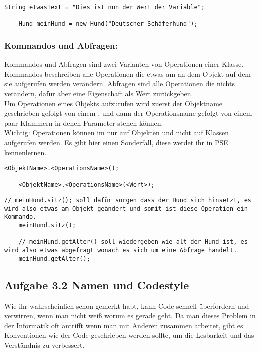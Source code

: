 \begin{lstlisting}[title=\textbf{Variable Beispiel}]
	String etwasText = "Dies ist nun der Wert der Variable";
	
	Hund meinHund = new Hund("Deutscher Schäferhund");
\end{lstlisting}
\begin{Infobox}
	\subsubsection*{Kommandos und Abfragen:}
	Kommandos und Abfragen sind zwei Varianten von Operationen einer Klasse. Kommandos beschreiben alle Operationen die etwas am an dem Objekt auf dem sie aufgerufen werden verändern.
	Abfragen sind alle Operationen die nichts verändern, dafür aber eine Eigenschaft als Wert zurückgeben.\\
	Um Operationen eines Objekts aufzurufen wird zuerst der Objektname geschrieben gefolgt von einem . und dann der Operationsname gefolgt von einem paar Klammern in denen Parameter stehen können.\\
	{\color{red} Wichtig: } Operationen können im nur auf Objekten und nicht auf Klassen aufgerufen werden.
	Es  gibt hier einen Sonderfall, diese werdet ihr in PSE kennenlernen.
\end{Infobox}
\begin{lstlisting}[title=\textbf{Kommando/Abfrage Syntax}]
	<ObjektName>.<OperationsName>();
	
	<ObjektName>.<OperationsName>(<Wert>);
\end{lstlisting}
\newpage
\begin{lstlisting}[title=\textbf{Kommando/Abfrage Beispiel}]
	// meinHund.sitz(); soll dafür sorgen dass der Hund sich hinsetzt, es wird also etwas am Objekt geändert und somit ist diese Operation ein Kommando.
	meinHund.sitz();
	
	// meinHund.getAlter() soll wiedergeben wie alt der Hund ist, es wird also etwas abgefragt wonach es sich um eine Abfrage handelt.
	meinHund.getAlter();
\end{lstlisting}

\subsection*{Aufgabe 3.2 Namen und Codestyle}
Wie ihr wahrscheinlich schon gemerkt habt, kann Code schnell überfordern und verwirren, wenn man nicht weiß worum es gerade geht.
Da man dieses Problem in der Informatik oft antrifft wenn man mit Anderen zusammen arbeitet, gibt es Konventionen wie der Code geschrieben werden sollte, um die Lesbarkeit und das Verständnis zu verbessert.

